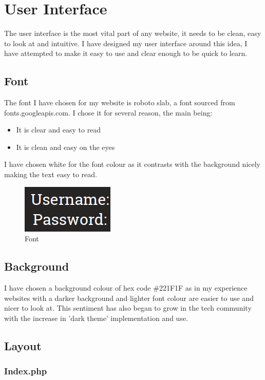\documentclass[10pt,a4paper]{report}
\begin{document}
	\newpage
	\section{User Interface}
	The user interface is the most vital part of any website, it needs to be clean, easy to look at and intuitive. I have designed my user interface around this idea, I have attempted to make it easy to use and clear enough to be quick to learn.
	\subsection{Font}
	The font I have chosen for my website is roboto slab, a font sourced from fonts.googleapis.com. I chose it for several reason, the main being:
		\begin{itemize}
			\item It is clear and easy to read
			\item It is clean and easy on the eyes
		\end{itemize}
	I have chosen white for the font colour as it contrasts with the background nicely making the text easy to read.
	\begin{figure}
		\centering
		\includegraphics{Font}
		\caption{Font}
	\end{figure}
	
	
	\subsection{Background}
	I have chosen a background colour of hex code \#221F1F as in my experience websites with a darker background and lighter font colour are easier to use and nicer to look at. This sentiment has also began to grow in the tech community with the increase in 'dark theme' implementation and use.
	
	\subsection{Layout}
	\subsubsection{Index.php}
	
\end{document}

